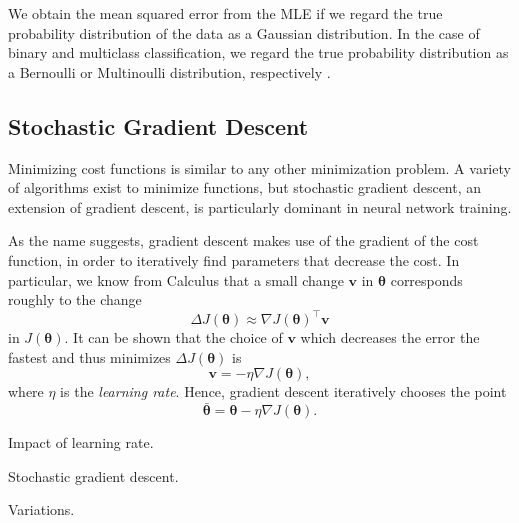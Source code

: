 We obtain the mean squared error from the MLE if we regard the true probability distribution of the data as a Gaussian distribution. In the case of binary and multiclass classification, we regard the true probability distribution as a Bernoulli or Multinoulli distribution, respectively \cite[ Ch.\,6,\,pp.\,175-185]{DBLP:books/daglib/0040158}.

\subsection{Stochastic Gradient Descent}
Minimizing cost functions is similar to any other minimization problem. A variety of algorithms exist to minimize functions, but stochastic gradient descent, an extension of gradient descent, is particularly dominant in neural network training.

As the name suggests, gradient descent makes use of the gradient of the cost function, in order to iteratively find parameters that decrease the cost. In particular, we know from Calculus that a small change $\bm{v}$ in $\bm{\theta}$ corresponds roughly to the change
\begin{equation}
\Delta J(\bm{\theta}) \approx \nabla J(\bm{\theta})^{\top}\bm{v}
\end{equation}
in $J(\bm{\theta})$. It can be shown that the choice of $\bm{v}$ which decreases the error the fastest and thus minimizes $\Delta J(\bm{\theta})$ is
\begin{equation}
\bm{v} = -\eta\nabla J(\bm{\theta}),
\end{equation}
where $\eta$ is the \emph{learning rate}. Hence, gradient descent iteratively chooses the point
\begin{equation}
\bar{\bm{\theta}} = \bm{\theta} - \eta\nabla J(\bm{\theta}).
\end{equation}

Impact of learning rate.

Stochastic gradient descent.

Variations.

\begin{comment}
Applying the Cauchy-Schwarz inequality, we obtain
\begin{equation}\label{eq:cauchy-schwarz}
-\lVert\nabla J(\bm{\theta})\rVert\lVert v\rVert \leq
\nabla J(\bm{\theta})^{\top}\bm{v} \leq
\lVert\nabla J(\bm{\theta})\rVert\lVert v\rVert.
\end{equation}
We observe that, if we set $\bm{v} = -\eta\nabla J(\bm{\theta})$, then
\begin{equation}
\nabla J(\bm{\theta})^{\top}\bm{v} = -\eta\lVert\nabla J(\bm{\theta})\rVert^2,
\end{equation}
which is exactly the left-hand side of Eq. \eqref{eq:cauchy-schwarz}. Thus, in order to minimize $\Delta J(\bm{\theta})$, we can choose new parameters $\bar{\bm{\theta}}$ with the update rule
\begin{equation}
\bar{\bm{\theta}} = \bm{\theta} - \eta\nabla J(\bm{\theta}),
\end{equation}
\end{comment}

